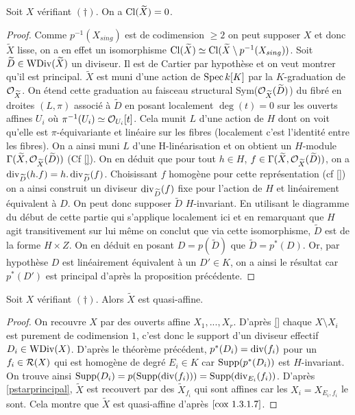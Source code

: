 \begin{thm}\label{clgtrivial}
Soit $X$ vérifiant $(\dagger)$. On a $\operatorname{Cl}(\widetilde{X})=0$.
\end{thm}
\begin{proof}
Comme $p^{-1}(X_{sing})$ est de codimension $\geq 2$ on peut supposer $X$ et donc $\widetilde{X}$ lisse, on a en effet un isomorphisme $\operatorname{Cl}(\widetilde{X})\simeq\operatorname{Cl}(\widetilde{X}\setminus p^{-1}(X_{sing}))$. Soit $\widetilde{D}\in \operatorname{WDiv}(\widetilde{X})$ un diviseur. Il est de Cartier par hypothèse et on veut montrer qu'il est principal. $\widetilde{X}$ est muni d'une action de $\operatorname{Spec} k[K]$ par la $K$-graduation de $\mathcal{O}_{\widetilde{X}}$. On étend cette graduation au faisceau structural Sym($\mathcal{O}_{\widetilde{X}}(\widetilde{D})$) du fibré en droites $(L,\pi)$ associé à $\widetilde{D}$ en posant localement $\deg(t)=0$ sur les ouverts affines $U_i$ où $\pi^{-1}(U_i)\simeq \mathcal{O}_{U_i}[t]$. Cela munit $L$ d'une action de $H$ dont on voit qu'elle est $\pi$-équivariante et linéaire sur les fibres (localement c'est l'identité entre les fibres). On a ainsi muni $L$ d'une H-linéarisation et on obtient un $H$-module $\Gamma(\widetilde{X}, \mathcal{O}_{\widetilde{X}}(\widetilde{D}))$ (Cf \ref{}). On en déduit que pour tout $h\in H$, $f\in \Gamma(\widetilde{X}, \mathcal{O}_{\widetilde{X}}(\widetilde{D}))$, on a $\operatorname{div}_{\widetilde{D}}(h.f)=h.\operatorname{div}_{\widetilde{D}}(f)$. Choisissant $f$ homogène pour cette représentation (cf \ref{}) on a ainsi construit un diviseur $\operatorname{div}_{\widetilde{D}}(f)$ fixe pour l'action de $H$ et linéairement équivalent à $D$. On peut donc supposer $\widetilde{D}$ $H$-invariant. En utilisant le diagramme du début de cette partie qui s'applique localement ici et en remarquant que $H$ agit transitivement sur lui même on conclut que via cette isomorphisme, $\widetilde{D}$ est de la forme $H\times Z$. On en déduit en posant $D=p(\widetilde{D})$ que $\widetilde{D}=p^*(D)$. Or, par hypothèse $D$ est linéairement équivalent à un $D'\in K$, on a ainsi le résultat car $p^*(D')$ est principal d'après la proposition précédente.
\end{proof}

\begin{cor}
Soit $X$ vérifiant $(\dagger)$. Alors $\widetilde{X}$ est quasi-affine.
\end{cor}
\begin{proof}
On recouvre $X$ par des ouverts affine $X_1,...,X_r$. D'après \ref{} chaque $X\setminus X_i$ est purement de codimension $1$, c'est donc le support d'un diviseur effectif $D_i\in \operatorname{WDiv}(X)$. D'après le théorème précédent, $p^*(D_i)=\operatorname{div}(f_i)$ pour un $f_i\in \mathcal{R}(X)$ qui est homogène de degré $E_i\in K$ car $\operatorname{Supp}(p^*(D_i))$ est $H$-invariant. On trouve ainsi $\operatorname{Supp}(D_i)=p(\operatorname{Supp}(\operatorname{div}(f_i)))=\operatorname{Supp}(\operatorname{div}_{E_i}(f_i))$. D'après \ref{pstarprincipal}, $\widetilde{X}$ est recouvert par des $\widetilde{X}_{f_i}$ qui sont affines car les $X_i=X_{E_i,f_i}$ le sont. Cela montre que $\widetilde{X}$ est quasi-affine d'après $\ref{cox 1.3.1.7}$.
\end{proof}

